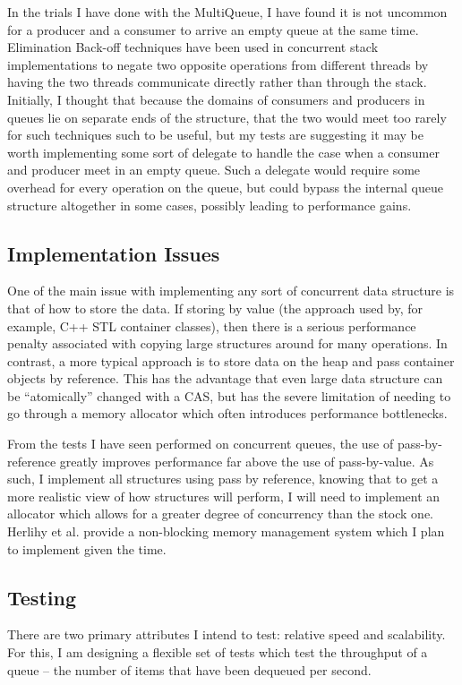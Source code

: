 \documentclass[12pt]{report}
\begin{document}
In the trials I have done with the MultiQueue, I have found it is not uncommon
for a producer and a consumer to arrive an empty queue at the same time.
Elimination Back-off techniques have been used in concurrent stack
implementations to negate two opposite operations from different threads by
having the two threads communicate directly rather than through the stack.
Initially, I thought that because the domains of consumers and producers in
queues lie on separate ends of the structure, that the two would meet too
rarely for such techniques such to be useful, but my tests are suggesting it
may be worth implementing some sort of delegate to handle the case when a
consumer and producer meet in an empty queue. Such a delegate would require
some overhead for every operation on the queue, but could bypass the internal
queue structure altogether in some cases, possibly leading to performance
gains.

\subsection{Implementation Issues}
One of the main issue with implementing any sort of concurrent data structure
is that of how to store the data. If storing by value (the approach used by,
for example, C++ STL container classes), then there is a serious performance
penalty associated with copying large structures around for many operations. In
contrast, a more typical approach is to store data on the heap and pass
container objects by reference. This has the advantage that even large data
structure can be ``atomically'' changed with a CAS, but has the severe
limitation of needing to go through a memory allocator which often introduces
performance bottlenecks.

From the tests I have seen performed on concurrent queues, the use of
pass-by-reference greatly improves performance far above the use of
pass-by-value.\cite{suttertest}  As such, I implement all structures using pass
by reference, knowing that to get a more realistic view of how structures will
perform, I will need to implement an allocator which allows for a greater
degree of concurrency than the stock one. Herlihy et al. provide a non-blocking
memory management system which I plan to implement given the
time.\cite{herlihy2005}

\subsection{Testing}
There are two primary attributes I intend to test: relative speed and
scalability. For this, I am designing a flexible set of tests which test the
throughput of a queue -- the number of items that have been dequeued per
second.
\end{document}
